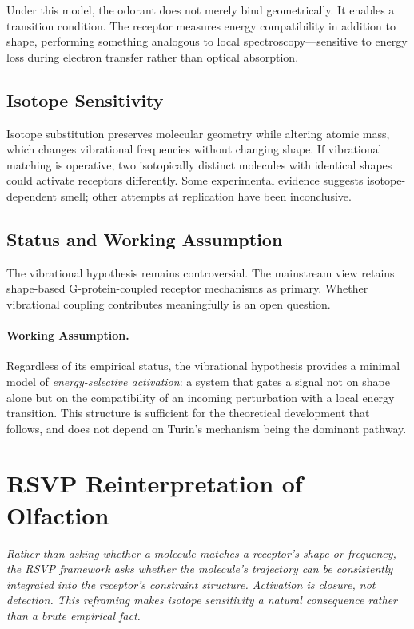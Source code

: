 \documentclass[12pt,a4paper]{article}
\begin{document}
Under this model, the odorant does not merely bind geometrically. It enables a transition condition. The receptor measures energy compatibility in addition to shape, performing something analogous to local spectroscopy---sensitive to energy loss during electron transfer rather than optical absorption.

\subsection{Isotope Sensitivity}

Isotope substitution preserves molecular geometry while altering atomic mass, which changes vibrational frequencies without changing shape. If vibrational matching is operative, two isotopically distinct molecules with identical shapes could activate receptors differently. Some experimental evidence suggests isotope-dependent smell; other attempts at replication have been inconclusive.

\subsection{Status and Working Assumption}

The vibrational hypothesis remains controversial. The mainstream view retains shape-based G-protein-coupled receptor mechanisms as primary. Whether vibrational coupling contributes meaningfully is an open question.

\paragraph{Working Assumption.}
Regardless of its empirical status, the vibrational hypothesis provides a minimal model of \emph{energy-selective activation}: a system that gates a signal not on shape alone but on the compatibility of an incoming perturbation with a local energy transition. This structure is sufficient for the theoretical development that follows, and does not depend on Turin's mechanism being the dominant pathway.

\section{RSVP Reinterpretation of Olfaction}
\label{sec:olfaction_rsvp}

\textit{Rather than asking whether a molecule matches a receptor's shape or frequency, the RSVP framework asks whether the molecule's trajectory can be consistently integrated into the receptor's constraint structure. Activation is closure, not detection. This reframing makes isotope sensitivity a natural consequence rather than a brute empirical fact.}
\end{document}
